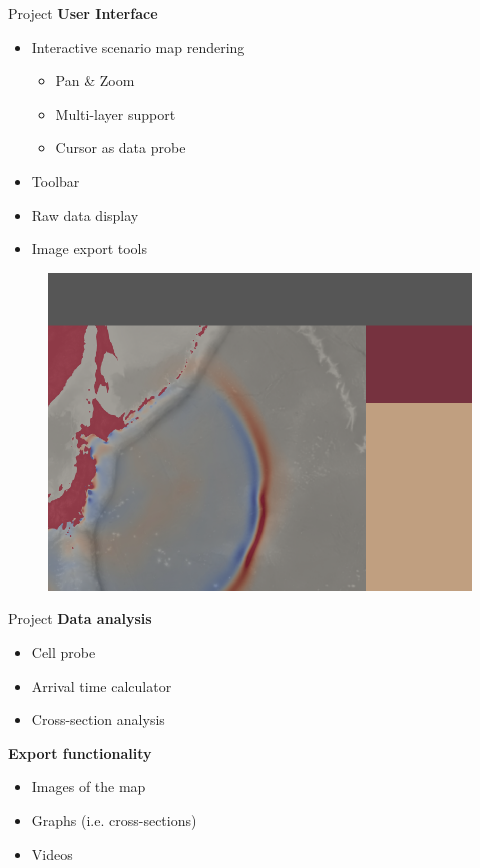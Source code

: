 \documentclass[shortpres,usenames,dvipsnames]{beamer}
\begin{document}
\begin{frame}{Project}
	\textbf{User Interface}
	\begin{multicols}{2}
		\begin{itemize}
			\item Interactive scenario map rendering
			\begin{itemize}
				\item Pan \& Zoom
				\item Multi-layer support
				\item Cursor as data probe
			\end{itemize}
			\item \textcolor{guitoolbar}{Toolbar}
			\item \textcolor{guidata}{Raw data display}
			\item \textcolor{guiexport}{Image export tools}
		\end{itemize}
		
	\columnbreak
		\centering
		\begin{figure}
			\includegraphics[clip,width=\linewidth]{img/GUI.png}
		\end{figure}	
	\end{multicols}
\end{frame}

\begin{frame}{Project}
	\textbf{Data analysis}
	\begin{itemize}
		\item Cell probe
		\item Arrival time calculator
		\item Cross-section analysis
	\end{itemize}
	
	\textbf{Export functionality}
	\begin{itemize}
		\item Images of the map
		\item Graphs (i.e. cross-sections)
		\item Videos
	\end{itemize}
\end{frame}
\end{document}

